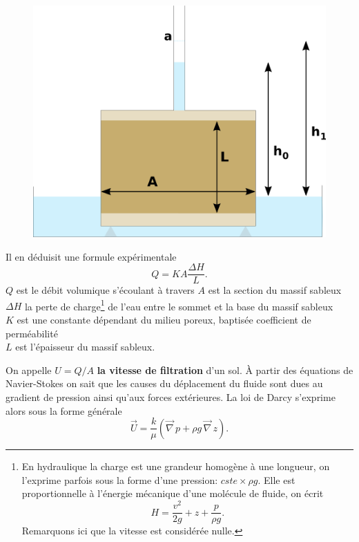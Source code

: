 \documentclass[a4paper,11pt]{article}
\numberwithin{equation}{section}
\begin{document}
\begin{figure}[H]
	\begin{center}
		\includegraphics[scale=0.4]{darcy.png}
	\end{center}
\end{figure}

Il en déduisit une formule expérimentale
\begin{equation}
	\label{eq-Darcy-1}
	Q=KA\frac{\Delta H}{L}.
\end{equation}
$Q$ est le débit volumique s'écoulant à travers  
$A$ est la section du massif sableux\\
$\Delta H$ la perte de charge\footnote{En hydraulique la charge est une grandeur homogène à une longueur, on l'exprime parfois sous la forme d'une pression: $cste\times\rho g$. Elle est proportionnelle à l'énergie mécanique d'une molécule de fluide, on écrit \[H=\frac{v^2}{2g}+ z+ \frac{p}{\rho g}.\] Remarquons ici que la vitesse est considérée nulle.} de l'eau entre le sommet et la base du massif sableux\\
$K$ est une constante dépendant du milieu poreux, baptisée coefficient de perméabilité\\
$L$ est l'épaisseur du massif sableux.



\vspace{0.7cm}

On appelle $U=Q/A$ \textbf{la vitesse de filtration} d'un sol. À partir des équations de Navier-Stokes on sait que les causes du déplacement du fluide sont dues au gradient de pression ainsi qu'aux forces extérieures. La loi de Darcy s'exprime alors sous la forme générale
\begin{equation}
	\label{eq-Darcy}
	\overrightarrow{U}=\frac{k}{\mu }(\overrightarrow{\nabla}\, p+\rho g \,\overrightarrow{\nabla}\, z).
\end{equation} 
\end{document}
